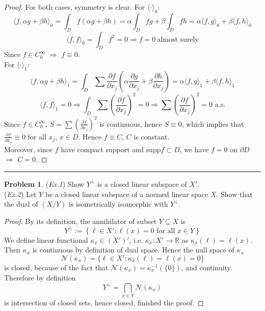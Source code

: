 \documentclass[a4paper, 10pt]{article}
\theoremstyle{definition}
\newtheorem{problem}{Problem}
\theoremstyle{hSol}
\begin{document}
\begin{proof} For both cases, symmetry is clear. For $\langle \cdot \rangle_0$:
\begin{equation}
	\langle f,\alpha g+\beta h \rangle_0 = \int_D f(\alpha g+\beta h) = \alpha \int_D fg + \beta \int_D fh = \alpha \langle f,g \rangle_0 + \beta \langle f,h \rangle_0
\end{equation}
\begin{equation}
	\langle f,f \rangle_0 = \int_D f^2 = 0 \Rightarrow f=0~\text{almost surely}
\end{equation}
Since $f\in C_0^{\infty}$ $\Rightarrow$ $f\equiv 0$. \\
For $\langle \cdot \rangle_1$:
\begin{equation}
	\langle f,\alpha g+\beta h \rangle_1 = \int_D \sum \frac{\partial f}{\partial x_j}\left(\alpha\frac{\partial g}{\partial x_j}+\beta\frac{\partial h}{\partial x_j}\right) = \alpha \langle f,g \rangle_1 + \beta \langle f,h \rangle_1
\end{equation}
\begin{equation}
	\langle f,f \rangle_1 = 0 \Rightarrow \int_D \sum \left(\frac{\partial f}{\partial x_j}\right)^2 = 0 \Rightarrow \sum \left(\frac{\partial f}{\partial x_j}\right)^2=0\text{ a.s.}
\end{equation}
Since $f\in C_0^{\infty}$, $S=\sum \left(\frac{\partial f}{\partial x_j}\right)^2$ is continuous, hence $S\equiv0$, which implies that $\frac{\partial f}{\partial x_j}\equiv 0$ for all $x_j$, $x\in D$. Hence $f\equiv C$, $C$ is constant. \\
Moreover, since $f$ have compact support and $\text{supp}f\subset D$, we have $f=0$ on $\partial D$ $\Rightarrow$ $C=0$.
\end{proof}


\noindent\rule{16cm}{0.4pt}
\begin{problem} (\textit{Ex.1}) Show $Y^{\bot}$ is a closed linear subspace of $X'$. \\
(\textit{Ex.2}) Let $Y$ be a closed linear subspace of a normed linear space $X$. Show that the dual of $(X/Y)$ is isometrically isomorphic with $Y^{\bot}$.
\end{problem}

\begin{proof} By its definition, the annihilator of subset $Y\subseteq X$ is
$$Y^{\bot}:=\left\{\ell \in X': \ell(x)=0\text{ for all }x\in Y\right\}$$
We define linear functional $\kappa_x \in (X')'$, i.e. $\kappa_x: X'\to \mathbb{R}$ as $\kappa_x(\ell)=\ell(x)$. Then $\kappa_x$ is continuous by definition of dual space. Hence the null space of $\kappa_x$
$$\mathcal{N}(\kappa_x)=\{\ell\in X': \kappa_x(\ell)=\ell(x)=0\}$$
is closed, because of the fact that $\mathcal{N}(\kappa_x) = \kappa_x^{-1}(\{0\})$, and continuity. \\
Therefore by definition
$$Y^{\bot} = \bigcap_{x\in Y}\mathcal{N}(\kappa_x)$$
is intersection of closed sets, hence closed, finished the proof.
\end{proof}
\end{document}
